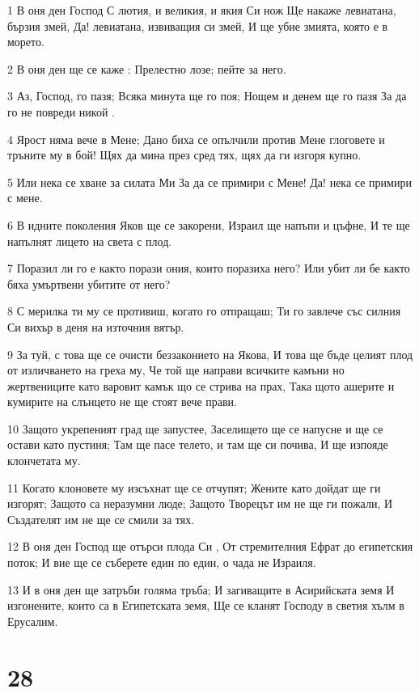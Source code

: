 \par 1 В оня ден Господ С лютия, и великия, и якия Си нож Ще накаже левиатана, бързия змей, Да! левиатана, извиващия си змей, И ще убие змията, която е в морето.
\par 2 В оня ден ще се каже : Прелестно лозе; пейте за него.
\par 3 Аз, Господ, го пазя; Всяка минута ще го поя; Нощем и денем ще го пазя За да го не повреди никой .
\par 4 Ярост няма вече в Мене; Дано биха се опълчили против Мене глоговете и тръните му в бой! Щях да мина през сред тях, щях да ги изгоря купно.
\par 5 Или нека се хване за силата Ми За да се примири с Мене! Да! нека се примири с мене.
\par 6 В идните поколения Яков ще се закорени, Израил ще напъпи и цъфне, И те ще напълнят лицето на света с плод.
\par 7 Поразил ли го е както порази ония, които поразиха него? Или убит ли бе както бяха умъртвени убитите от него?
\par 8 С мерилка ти му се противиш, когато го отпращаш; Ти го завлече със силния Си вихър в деня на източния вятър.
\par 9 За туй, с това ще се очисти беззаконието на Якова, И това ще бъде целият плод от изличването на греха му, Че той ще направи всичките камъни но жертвениците като варовит камък що се стрива на прах, Така щото ашерите и кумирите на слънцето не ще стоят вече прави.
\par 10 Защото укрепеният град ще запустее, Заселището ще се напусне и ще се остави като пустиня; Там ще пасе телето, и там ще си почива, И ще изпояде клончетата му.
\par 11 Когато клоновете му изсъхнат ще се отчупят; Жените като дойдат ще ги изгорят; Защото са неразумни люде; Защото Творецът им не ще ги пожали, И Създателят им не ще се смили за тях.
\par 12 В оня ден Господ ще отърси плода Си , От стремителния Ефрат до египетския поток; И вие ще се съберете един по един, о чада не Израиля.
\par 13 И в оня ден ще затръби голяма тръба; И загиващите в Асирийската земя И изгонените, които са в Египетската земя, Ще се кланят Господу в светия хълм в Ерусалим.

\chapter{28}

